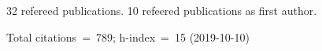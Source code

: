 32 refereed publications. 10 refeered publications as first author.

Total citations~=~789; h-index~=~15 (2019-10-10)
